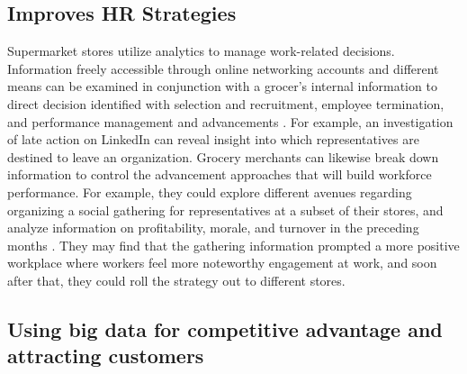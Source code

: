 \documentclass[sigconf]{acmart}
\begin{document}
\subsection{Improves HR Strategies}

Supermarket stores utilize analytics to manage work-related decisions. Information freely accessible through online networking accounts and different means can be examined in conjunction with a grocer's internal information to direct decision identified with selection and recruitment, employee termination, and performance management and advancements \cite{4}. For example, an investigation of late action on LinkedIn can reveal insight into which representatives are destined to leave an organization.  
 	Grocery merchants can likewise break down information to control the advancement approaches that will build workforce performance. For example, they could explore different avenues regarding organizing a social gathering for representatives at a subset of their stores, and analyze information on profitability, morale, and turnover in the preceding months \cite{1}. They may find that the gathering information prompted a more positive workplace where workers feel more noteworthy engagement at work, and soon after that, they could roll the strategy out to different stores. 


\subsection{Using big data for competitive advantage and attracting customers}
\end{document}
